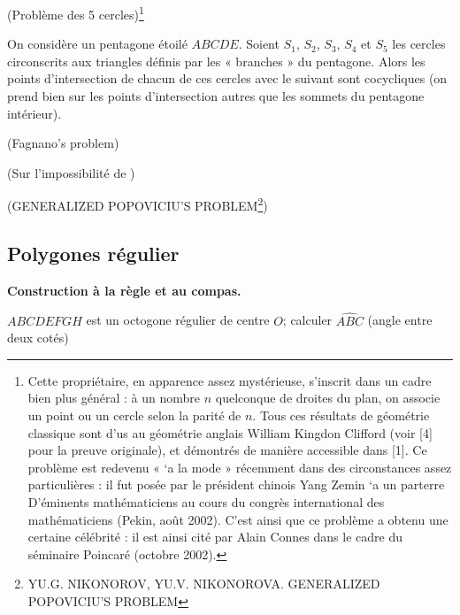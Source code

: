 \begin{exercise}{(Problème des 5 cercles)\footnote{Cette propriétaire, en apparence assez mystérieuse, s'inscrit dans un cadre bien plus général : à un nombre $n$ quelconque de droites du plan, on associe un point
ou un cercle selon la parité de $n$. Tous ces résultats de géométrie classique sont d'us au géométrie anglais William Kingdon Clifford (voir [4] pour la preuve originale), et démontrés de manière accessible dans [1]. Ce problème est redevenu « `a la mode » récemment dans des circonstances assez particulières : il fut posée
par le président chinois Yang Zemin `a un parterre D’éminents mathématiciens au cours du congrès international des mathématiciens (Pekin, août 2002). C’est ainsi que ce problème a obtenu une certaine célébrité : il est ainsi cité par Alain Connes dans le cadre du séminaire Poincaré (octobre 2002).}}

On considère un pentagone étoilé $ABCDE$. Soient $S_{1}$, $S_{2}$, $S_{3}$, $S_{4}$ et $S_{5}$  les cercles circonscrits aux triangles définis par les « branches » du pentagone. Alors les points d'intersection
de chacun de ces cercles avec le suivant sont cocycliques (on prend bien sur les points d'intersection autres que les sommets du pentagone intérieur). 
\end{exercise}
\begin{exercise}{(Fagnano's problem)}
\end{exercise}
\begin{exercise}{(Sur l'impossibilité de )}
\end{exercise}

\begin{exercise}{(GENERALIZED POPOVICIU’S PROBLEM\footnote{YU.G. NIKONOROV, YU.V. NIKONOROVA. GENERALIZED POPOVICIU’S PROBLEM})}
\end{exercise}
\subsection{Polygones régulier}

\begin{definition}
\end{definition}

\textbf{Construction à la règle et au compas.}
\\
\begin{example}
$ABCDEFGH$ est un octogone régulier de centre $O$; calculer $\widehat{ABC}$ (angle entre deux cotés)
\end{example}

